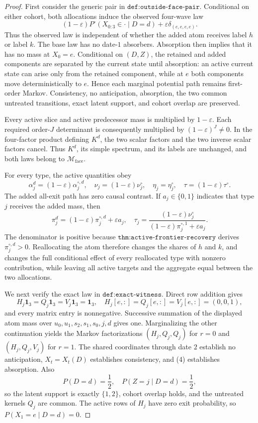 \documentclass{article}
\begin{document}
\begin{proof}
First consider the generic pair in \(\texttt{def:outside-face-pair}\).  Conditional on either cohort, both allocations induce the observed four-wave law
\[
 (1-\varepsilon)P^\circ(X_{0:3}\in\cdot\mid D=d)
 +\varepsilon\delta_{(e,e,e,e)}.
\tag{1}
\]
Thus the observed law is independent of whether the added atom receives label \(h\) or label \(k\).  The base law has no date-\(1\) absorbers.  Absorption then implies that it has no mass at \(X_0=e\).  Conditional on \((D,Z)\), the retained and added components are separated by the current state until absorption: an active current state can arise only from the retained component, while at \(e\) both components move deterministically to \(e\).  Hence each marginal potential path remains first-order Markov.  Consistency, no anticipation, absorption, the two common untreated transitions, exact latent support, and cohort overlap are preserved.

Every active slice and active predecessor mass is multiplied by \(1-\varepsilon\).  Each required order-\(J\) determinant is consequently multiplied by \((1-\varepsilon)^J\ne0\).  In the four-factor product defining \(K^d\), the two scalar factors and the two inverse scalar factors cancel.  Thus \(K^d\), its simple spectrum, and its labels are unchanged, and both laws belong to \(\mathcal M_{\mathrm{face}}\).

For every type, the active quantities obey
\[
 \alpha_j^d=(1-\varepsilon)\alpha_j^{\circ,d},\quad
 \nu_j=(1-\varepsilon)\nu_j^\circ,\quad
 \eta_j=\eta_j^\circ,\quad
 \tau=(1-\varepsilon)\tau^\circ.
\tag{2}
\]
The added all-exit path has zero causal contrast.  If \(a_j\in\{0,1\}\) indicates that type \(j\) receives the added mass, then
\[
 \pi_j^d=(1-\varepsilon)\pi_j^{\circ,d}+\varepsilon a_j,
 \quad
 \tau_j=\frac{(1-\varepsilon)\nu_j^\circ}
 {(1-\varepsilon)\pi_j^{\circ,1}+\varepsilon a_j}.
\tag{3}
\]
The denominator is positive because \(\texttt{thm:active-frontier-recovery}\) derives \(\pi_j^{\circ,d}>0\).  Reallocating the atom therefore changes the shares of \(h\) and \(k\), and changes the full conditional effect of every reallocated type with nonzero contribution, while leaving all active targets and the aggregate equal between the two allocations.

We next verify the exact law in \(\texttt{def:exact-witness}\).  Direct row addition gives
\[
 H_j\mathbf1_3=Q_j\mathbf1_3=V_j\mathbf1_3=\mathbf1_3,
 \quad
 H_j[e,:]=Q_j[e,:]=V_j[e,:]=(0,0,1),
\tag{4}
\]
and every matrix entry is nonnegative.  Successive summation of the displayed atom mass over \(u_0,u_1,s_2,s_1,s_0,j,d\) gives one.  Marginalizing the other continuation yields the Markov factorizations \((H_j,Q_j,Q_j)\) for \(r=0\) and \((H_j,Q_j,V_j)\) for \(r=1\).  The shared coordinates through date \(2\) establish no anticipation, \(X_t=X_t(D)\) establishes consistency, and (4) establishes absorption.  Also
\[
 P(D=d)=\frac12,\quad P(Z=j\mid D=d)=\frac12,
\tag{5}
\]
so the latent support is exactly \(\{1,2\}\), cohort overlap holds, and the untreated kernels \(Q_j\) are common.  The active rows of \(H_j\) have zero exit probability, so \(P(X_1=e\mid D=d)=0\).


\end{proof}
\end{document}
